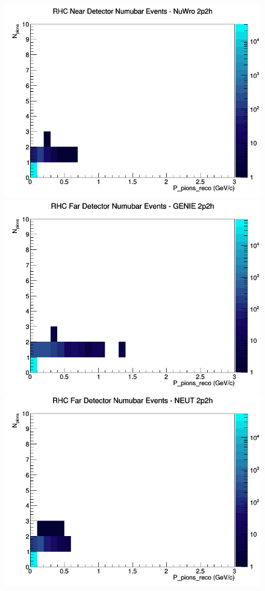 \documentclass[12pt]{article}
\begin{document}
\begin{figure}[h]
\includegraphics[width=\linewidth]{eff_N_P/FGT/pions/2p2h_RHC_ND_numubar_N_P_NuWro.png}
\endminipage
\newline
{}
\includegraphics[width=\linewidth]{eff_N_P/FGT/pions/2p2h_RHC_FD_numubar_N_P_GENIE.png}
\endminipage
{}
\includegraphics[width=\linewidth]{eff_N_P/FGT/pions/2p2h_RHC_FD_numubar_N_P_NEUT.png}

\end{figure}
\end{document}
